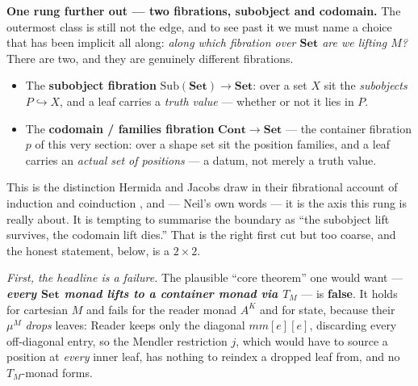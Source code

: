 \documentclass[11pt,a4paper]{book}
\newcommand{\Set}{\mathbf{Set}}
\newcommand{\Cont}{\mathbf{Cont}}
\theoremstyle{plain}
\theoremstyle{definition}
\theoremstyle{remark}
\begin{document}
\begin{teachbox}
\smallskip
\textbf{One rung further out --- two fibrations, subobject and codomain.} The outermost class is still not
the edge, and to see past it we must name a choice that has been implicit all along: \emph{along which
fibration over $\Set$ are we lifting $M$?} There are two, and they are genuinely different fibrations.
\begin{itemize}[nosep]
  \item The \textbf{subobject fibration} $\mathrm{Sub}(\Set)\to\Set$: over a set $X$ sit the
        \emph{subobjects} $P\hookrightarrow X$, and a leaf carries a \emph{truth value} --- whether or not
        it lies in $P$.
  \item The \textbf{codomain / families fibration} $\Cont\to\Set$ --- the container fibration $p$ of this
        very section: over a shape set sit the position families, and a leaf carries an \emph{actual set of
        positions} --- a datum, not merely a truth value.
\end{itemize}
This is the distinction Hermida and Jacobs draw in their fibrational account of induction and coinduction
\cite{HermidaJacobs98}, and --- Neil's own words --- it is the axis this rung is really about. It is
tempting to summarise the boundary as ``the subobject lift survives, the codomain lift dies.'' That is the
right first cut but too coarse, and the honest statement, below, is a $2\times2$.

\emph{First, the headline is a failure.} The plausible ``core theorem'' one would want ---
\textbf{\emph{every $\Set$ monad lifts to a container monad via $T_{M}$}} --- is \textbf{false}. It holds
for cartesian $M$ and fails for the reader monad $A^{K}$ and for state, because their $\mu^{M}$ \emph{drops}
leaves: Reader keeps only the diagonal $mm[e][e]$, discarding every off-diagonal entry, so the Mendler
restriction $j$, which would have to source a position at \emph{every} inner leaf, has nothing to reindex a
dropped leaf from, and no $T_{M}$-monad forms.


\end{teachbox}
\end{document}
